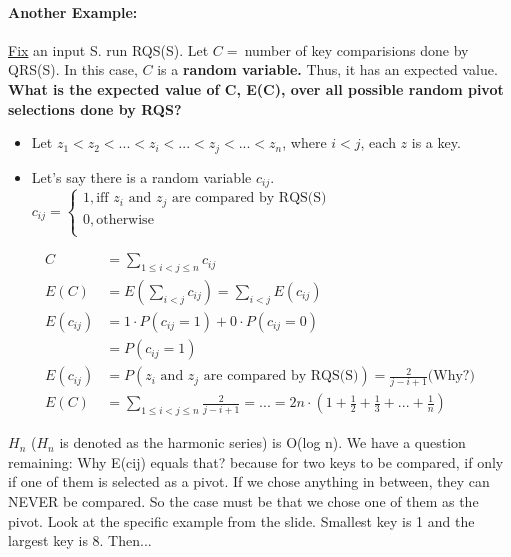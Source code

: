 \documentclass{article}
\begin{document}
\paragraph{Another Example: } \uline{Fix} an input S. run RQS(S). Let $C =\ $number of key comparisions done by QRS(S). In this case, $C$ is a \textbf{random variable.} Thus, it has an expected value. \textbf{What is the expected value of C, E(C), over all possible random pivot selections done by RQS?}\\
\begin{itemize}
\item 
Let $z_1 < z_2 <...<z_i<...<z_j<...<z_n$, where $i < j$, each $z$ is a key.
\item
Let's say there is a random variable $c_{ij}$. 
$c_{ij} = \begin{cases}
1, \text{iff $z_i$ and $z_j$ are compared by RQS(S)}\\
0, \text{otherwise}\\
\end{cases}
$
\end{itemize}
\begin{align}
C &= \sum_{1 \leq i < j \leq n}c_{ij}\\
E(C) &= E(\sum_{i < j} c_{ij}) = \sum_{i < j} E(c_{ij})\\
E(c_{ij}) &= 1 \cdot P(c_{ij} = 1) + 0 \cdot P(c_{ij} = 0)\\
&= P(c_{ij} = 1)\\
E(c_{ij}) &= P(\text{$z_i$ and $z_j$ are compared by RQS(S)}) = \frac{2}{j - i +1} \text{(Why?)}\\
E(C) &=\sum_{1 \leq i < j \leq n} \frac{2}{j - i + 1} = ... = {2n \cdot (1 + \frac{1}{2} + \frac{1}{3}  + ... +\frac{1}{n})} 
\end{align}

$H_n$ ($H_n$ is denoted as the harmonic series) is O(log n). We have a question remaining:
Why E(cij) equals that? because for two keys to be compared, if only if one of them is selected as a pivot. If we chose anything in between, they can NEVER be compared. So the case must be that we chose one of them as the pivot. Look at the specific example from the slide. Smallest key is 1 and the largest key is 8. Then... 
\end{document}

